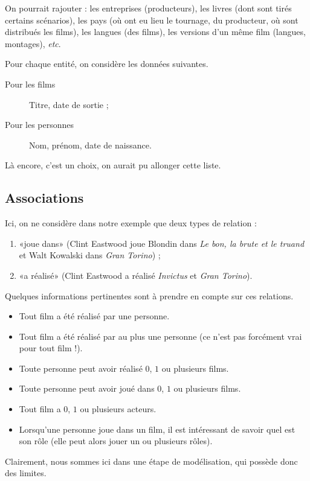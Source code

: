 \begin{rem}
  On pourrait rajouter : les entreprises (producteurs), les livres
  (dont sont tirés certains scénarios), les pays (où ont eu lieu le
  tournage, du producteur, où sont distribués les films), les langues
  (des films), les versions d'un même film (langues, montages), \emph{etc}.
\end{rem}


Pour chaque entité, on considère les données suivantes. 
\begin{description}
\item[Pour les films] Titre, date de sortie ;
\item[Pour les personnes] Nom, prénom, date de naissance.
\end{description}
\begin{rem}
  Là encore, c'est un choix, on aurait pu allonger cette liste. 
\end{rem}

\subsection{Associations}
Ici, on ne considère dans notre exemple que deux types de relation :
  \begin{enumerate}
  \item «joue dans» (Clint Eastwood joue Blondin dans \emph{Le bon, la brute
      et le truand} et Walt Kowalski dans \emph{Gran Torino}) ;
  \item «a réalisé» (Clint Eastwood a réalisé \emph{Invictus} et
    \emph{Gran Torino}).
  \end{enumerate}


Quelques informations pertinentes sont à prendre en compte sur ces relations.
\begin{itemize}
\item Tout film a été réalisé par une personne.
\item Tout film a été réalisé par au plus une personne (ce n'est pas forcément vrai pour tout film !).
\item Toute personne peut avoir réalisé $0$, $1$ ou plusieurs films.
\item Toute personne peut avoir joué dans $0$, $1$ ou plusieurs films.
\item Tout film a $0$, $1$ ou plusieurs acteurs.
\item Lorsqu'une personne joue dans un film, il est intéressant de
  savoir quel est son rôle (elle peut alors jouer un ou plusieurs rôles).
\end{itemize}
Clairement, nous sommes ici dans une étape de modélisation, qui possède donc des limites.

